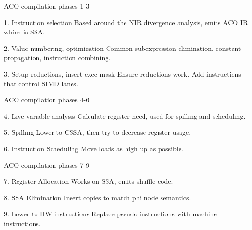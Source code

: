 \documentclass[aspectratio=169,t,xcolor=table]{beamer}
\begin{document}
\begin{frame}{ACO compilation phases 1-3}

    \footnotesize

    \begin{block}{1. Instruction selection}
        Based around the NIR divergence analysis, emits ACO IR which is SSA.
    \end{block}

    \begin{block}{2. Value numbering, optimization}
        Common subexpression elimination, constant propagation, instruction combining.
    \end{block}

    \begin{block}{3. Setup reductions, insert exec mask}
        Ensure reductions work. Add instructions that control SIMD lanes.
    \end{block}

\end{frame}

\begin{frame}{ACO compilation phases 4-6}

    \footnotesize

    \begin{block}{4. Live variable analysis}
        Calculate register need, used for spilling and scheduling.
    \end{block}

    \begin{block}{5. Spilling}
        Lower to CSSA, then try to decrease register usage.
    \end{block}

    \begin{block}{6. Instruction Scheduling}
        Move loads as high up as possible.
    \end{block}

\end{frame}

\begin{frame}{ACO compilation phases 7-9}

    \footnotesize

    \begin{block}{7. Register Allocation}
        Works on SSA, emits shuffle code.
    \end{block}

    \begin{block}{8. SSA Elimination}
        Insert copies to match phi node semantics.
    \end{block}

    \begin{block}{9. Lower to HW instructions}
        Replace pseudo instructions with machine instructions.
    \end{block}

\end{frame}
\end{document}
